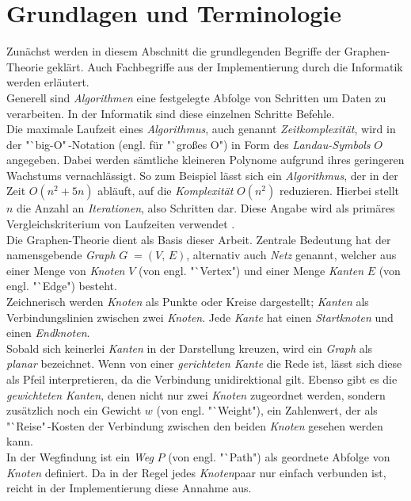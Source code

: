 \documentclass[12pt]{article}
\begin{document}
\section{Grundlagen und Terminologie}
\label{sec:basics}
Zunächst werden in diesem Abschnitt die grundlegenden Begriffe der Graphen-Theorie geklärt. Auch Fachbegriffe aus der Implementierung durch die Informatik werden erläutert.
\\
Generell sind \textit{Algorithmen} eine festgelegte Abfolge von Schritten um Daten zu verarbeiten. In der Informatik sind diese einzelnen Schritte Befehle.
\\
Die maximale Laufzeit eines \textit{Algorithmus}, auch genannt \textit{Zeitkomplexität}, wird in der "`big-O"\,-Notation (engl. für "`großes O") in Form des \textit{Landau-Symbols} $O$ angegeben. Dabei werden sämtliche kleineren Polynome aufgrund ihres geringeren Wachstums vernachlässigt. So zum Beispiel lässt sich ein \textit{Algorithmus}, der in der Zeit $O(n^2+5n)$ abläuft, auf die \textit{Komplexität} $O(n^2)$ reduzieren. Hierbei stellt $n$ die Anzahl an \textit{Iterationen}, also Schritten dar. Diese Angabe wird als primäres Vergleichskriterium von Laufzeiten verwendet \cite{big-o}.
\\
Die Graphen-Theorie dient als Basis dieser Arbeit. Zentrale Bedeutung hat der namensgebende \textit{Graph} $G\; = (V,\,E)$, alternativ auch \textit{Netz} genannt, welcher aus einer Menge von \textit{Knoten} $V$ (von engl. "`Vertex") und einer Menge \textit{Kanten} $E$ (von engl. "`Edge") besteht.
\\
Zeichnerisch werden \textit{Knoten} als Punkte oder Kreise dargestellt; \textit{Kanten} als Verbindungslinien zwischen zwei \textit{Knoten}. Jede \textit{Kante} hat einen \textit{Startknoten} und einen \textit{Endknoten}. 
\\
Sobald sich keinerlei \textit{Kanten} in der Darstellung kreuzen, wird ein \textit{Graph} als \textit{planar} bezeichnet. Wenn von einer \textit{gerichteten Kante} die Rede ist, lässt sich diese als Pfeil interpretieren, da die Verbindung unidirektional gilt. Ebenso gibt es die \textit{gewichteten Kanten}, denen nicht nur zwei \textit{Knoten} zugeordnet werden, sondern zusätzlich noch ein Gewicht $w$ (von engl. "`Weight"), ein Zahlenwert, der als "`Reise"\,-Kosten der Verbindung zwischen den beiden \textit{Knoten} gesehen werden kann.
\\
In der Wegfindung ist ein \textit{Weg} $P$ (von engl. "`Path") als geordnete Abfolge von \textit{Knoten} definiert. Da in der Regel jedes \textit{Knoten}paar nur einfach verbunden ist, reicht in der Implementierung diese Annahme aus.
\end{document}
